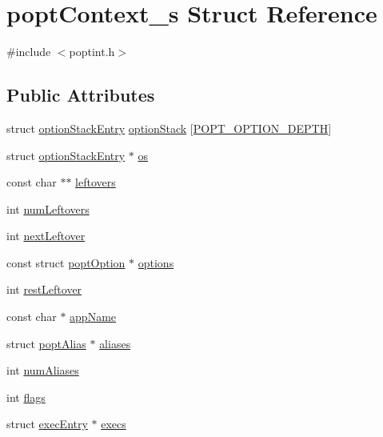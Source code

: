 \hypertarget{structpopt_context__s}{}\section{popt\+Context\+\_\+s Struct Reference}
\label{structpopt_context__s}


{\ttfamily \#include $<$poptint.\+h$>$}

\subsection*{Public Attributes}
\begin{DoxyCompactItemize}
\item 
struct \hyperlink{structoption_stack_entry}{option\+Stack\+Entry} \hyperlink{structpopt_context__s_afb4fe00e407510f15c15de9bcdcc9a03}{option\+Stack} \mbox{[}\hyperlink{popt_8h_aa50bd81d1fa1d17100540e00b5f7acfd}{P\+O\+P\+T\+\_\+\+O\+P\+T\+I\+O\+N\+\_\+\+D\+E\+P\+T\+H}\mbox{]}
\item 
struct \hyperlink{structoption_stack_entry}{option\+Stack\+Entry} $\ast$ \hyperlink{structpopt_context__s_a5cdc6e58403772122b3cfe4a0dcae0d2}{os}
\item 
const char $\ast$$\ast$ \hyperlink{structpopt_context__s_a132c28f3847ded144880e1b1ee4231a7}{leftovers}
\item 
int \hyperlink{structpopt_context__s_aa7a13994df6f103d61fed3bd5bada6e2}{num\+Leftovers}
\item 
int \hyperlink{structpopt_context__s_a217a5349eaed3f52683f2b8fa751e3e0}{next\+Leftover}
\item 
const struct \hyperlink{structpopt_option}{popt\+Option} $\ast$ \hyperlink{structpopt_context__s_a48c8142fb4e0920ba096d95021fbd652}{options}
\item 
int \hyperlink{structpopt_context__s_abe76dfc76f4a31852dafd07ae0361537}{rest\+Leftover}
\item 
const char $\ast$ \hyperlink{structpopt_context__s_aafe275efe496fa1217d5d8dff6434aa9}{app\+Name}
\item 
struct \hyperlink{structpopt_alias}{popt\+Alias} $\ast$ \hyperlink{structpopt_context__s_ae675637b6716c9430e34235a41c15747}{aliases}
\item 
int \hyperlink{structpopt_context__s_afb0ace2c6600299043a3ec8a922bc820}{num\+Aliases}
\item 
int \hyperlink{structpopt_context__s_a62495f10b1c05f6ac186b5925b048a8f}{flags}
\item 
struct \hyperlink{structexec_entry}{exec\+Entry} $\ast$ \hyperlink{structpopt_context__s_ad78193f12525b099056a152ebdddd5e9}{execs}
$$
\end{DoxyCompactItemize}
